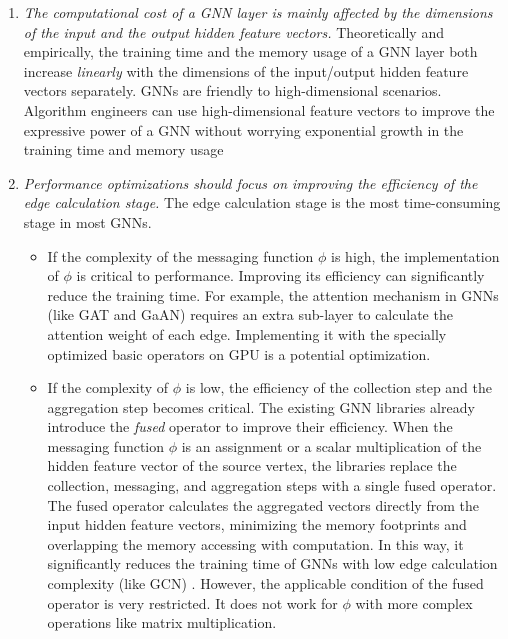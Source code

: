 \begin{enumerate}
    \item \emph{The computational cost of a GNN layer is mainly affected by the dimensions of the input and the output hidden feature vectors.}
          Theoretically and empirically, the training time and the memory usage of a GNN layer both increase \emph{linearly} with the dimensions of the input/output hidden feature vectors separately.
          GNNs are friendly to high-dimensional scenarios. 
          Algorithm engineers can use high-dimensional feature vectors to improve the expressive power of a GNN without worrying exponential growth in the training time and memory usage
    \item \emph{Performance optimizations should focus on improving the efficiency of the edge calculation stage.}
          The edge calculation stage is the most time-consuming stage in most GNNs.
          \begin{itemize}
              \item If the complexity of the messaging function $\phi$ is high, the implementation of $\phi$ is critical to performance.
                    Improving its efficiency can significantly reduce the training time.
                    For example, the attention mechanism in GNNs (like GAT and GaAN) requires an extra sub-layer to calculate the attention weight of each edge.
                    Implementing it with the specially optimized basic operators on GPU is a potential optimization.
              \item If the complexity of $\phi$ is low, the efficiency of the collection step and the aggregation step becomes critical.
                    The existing GNN libraries \cite{DGL, PyG, ma2019_neugraph} already introduce the \emph{fused} operator to improve their efficiency.
                    When the messaging function $\phi$ is an assignment or a scalar multiplication of the hidden feature vector of the source vertex, the libraries replace the collection, messaging, and aggregation steps with a single fused operator.
                    The fused operator calculates the aggregated vectors directly from the input hidden feature vectors, minimizing the memory footprints and overlapping the memory accessing with computation.
                    In this way, it significantly reduces the training time of GNNs with low edge calculation complexity (like GCN) \cite{yan2020_characterizing_gcn, zhang2020_analysis_neugraph}.
                    However, the applicable condition of the fused operator is very restricted.
                    It does not work for $\phi$ with more complex operations like matrix multiplication.

\end{itemize}
\end{enumerate}

